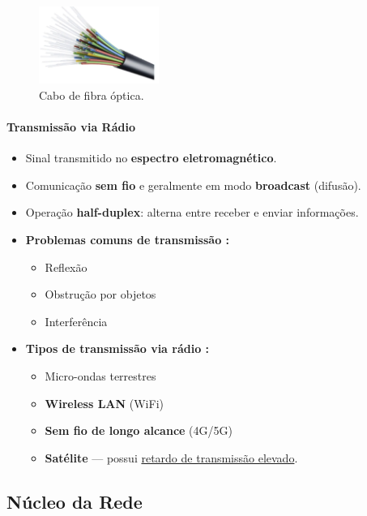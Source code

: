     \begin{figure}[H]
        \centering
        \includegraphics[width=0.35\textwidth]{img/cap-01/fibra-optica.png}
        \caption{Cabo de fibra óptica.}
    \end{figure}

    \paragraph{Transmissão via Rádio}
    \begin{itemize}[left=0.5cm, align=left, nosep]
        \item Sinal transmitido no \textbf{espectro eletromagnético}.
        \item Comunicação \textbf{sem fio} e geralmente em modo \textbf{broadcast} (difusão).
        \item Operação \textbf{half-duplex}: alterna entre receber e enviar informações.
        \item \textbf{Problemas comuns de transmissão :}
        \begin{itemize}[left=0.5cm, nosep, label=$\hookrightarrow$]
            \item Reflexão 
            \item Obstrução por objetos 
            \item Interferência 
        \end{itemize} 
        
        \item \textbf{Tipos de transmissão via rádio :} 
        \begin{itemize}[left=0.5cm, nosep, label=$\hookrightarrow$]
            \item Micro-ondas terrestres 
            \item \textbf{Wireless LAN} (WiFi) 
            \item \textbf{Sem fio de longo alcance} (4G/5G) 
            \item \textbf{Satélite} — possui \underline{retardo de transmissão elevado}.
        \end{itemize} 
    \end{itemize}

    \subsection{Núcleo da Rede}

